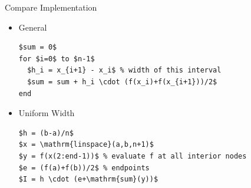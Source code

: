 \documentclass[10pt]{beamer}
\begin{document}
\begin{frame}[fragile]{Compare Implementation}

\begin{itemize}
\item General 
\begin{lstlisting}[mathescape]
$sum = 0$
for $i=0$ to $n-1$
  $h_i = x_{i+1} - x_i$ % width of this interval
  $sum = sum + h_i \cdot (f(x_i)+f(x_{i+1}))/2$
end
\end{lstlisting}
\item Uniform Width
\begin{lstlisting}[mathescape]
$h = (b-a)/n$
$x = \mathrm{linspace}(a,b,n+1)$
$y = f(x(2:end-1))$ % evaluate f at all interior nodes
$e = (f(a)+f(b))/2$ % endpoints
$I = h \cdot (e+\mathrm{sum}(y))$
\end{lstlisting}
\end{itemize}
    
\end{frame}
\end{document}
